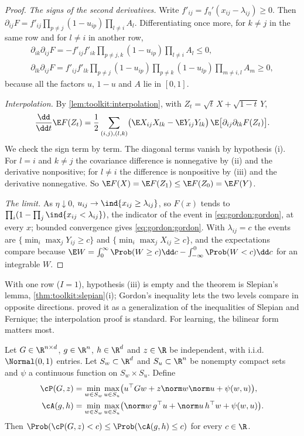 \begin{refsection}
\begin{proof}
\emph{The signs of the second derivatives.} Write $f'_{ij}=f_\eta'(x_{ij}-\lambda_{ij})\ge0$. Then $\partial_{ij}F=f'_{ij}\prod_{p\ne j}(1-u_{ip})\prod_{l\ne i}A_l$. Differentiating once more, for $k\ne j$ in the same row and for $l\ne i$ in another row,
\begin{gather*}
\partial_{ik}\partial_{ij}F=-f'_{ij}f'_{ik}\prod_{p\ne j,k}(1-u_{ip})\prod_{l\ne i}A_l\le0,\\
\partial_{lk}\partial_{ij}F=f'_{ij}f'_{lk}\prod_{p\ne j}(1-u_{ip})\prod_{p\ne k}(1-u_{lp})\prod_{m\ne i,l}A_m\ge0,
\end{gather*}
because all the factors $u$, $1-u$ and $A$ lie in $[0,1]$.

\emph{Interpolation.} By \cref{lem:toolkit:interpolation}, with $Z_t=\sqrt t\,X+\sqrt{1-t}\,Y$,
\[
\frac{\dd}{\dd t}\E F(Z_t)=\frac12\sum_{(i,j),(l,k)}\bigl(\E X_{ij}X_{lk}-\E Y_{ij}Y_{lk}\bigr)\,\E\bigl[\partial_{ij}\partial_{lk}F(Z_t)\bigr].
\]
We check the sign term by term. The diagonal terms vanish by hypothesis (i). For $l=i$ and $k\ne j$ the covariance difference is nonnegative by (ii) and the derivative nonpositive; for $l\ne i$ the difference is nonpositive by (iii) and the derivative nonnegative. So $\E F(X)=\E F(Z_1)\le\E F(Z_0)=\E F(Y)$.

\emph{The limit.} As $\eta\downarrow0$, $u_{ij}\to\ind\{x_{ij}\ge\lambda_{ij}\}$, so $F(x)$ tends to $\prod_i(1-\prod_j\ind\{x_{ij}<\lambda_{ij}\})$, the indicator of the event in \eqref{eq:gordon:gordon}, at every $x$; bounded convergence gives \eqref{eq:gordon:gordon}. With $\lambda_{ij}=c$ the events are $\{\min_i\max_jY_{ij}\ge c\}$ and $\{\min_i\max_jX_{ij}\ge c\}$, and the expectations compare because $\E W=\int_0^\infty\Prob(W\ge c)\dd c-\int_{-\infty}^0\Prob(W<c)\dd c$ for an integrable $W$.
\end{proof}

With one row ($I=1$), hypothesis (iii) is empty and the theorem is Slepian's lemma, \cref{thm:toolkit:slepian}(i); Gordon's inequality lets the two levels compare in opposite directions. \Textcite{Gordon1985} proved it as a generalization of the inequalities of Slepian and Fernique; the interpolation proof is standard. For learning, the bilinear form matters most.

\begin{lemma}\label{lem:gordon:minmax}
Let $G\in\R^{n\times d}$, $g\in\R^n$, $h\in\R^d$ and $z\in\R$ be independent, with i.i.d.\ $\Normal(0,1)$ entries. Let $S_w\subset\R^d$ and $S_u\subset\R^n$ be nonempty compact sets and $\psi$ a continuous function on $S_w\times S_u$. Define
\begin{align*}
\cP(G,z)&=\min_{w\in S_w}\max_{u\in S_u}\bigl(u^\top Gw+z\norm w\norm u+\psi(w,u)\bigr),\\
\cA(g,h)&=\min_{w\in S_w}\max_{u\in S_u}\bigl(\norm w\,g^\top u+\norm u\,h^\top w+\psi(w,u)\bigr).
\end{align*}
Then $\Prob(\cP(G,z)<c)\le\Prob(\cA(g,h)\le c)$ for every $c\in\R$.
\end{lemma}


\end{refsection}
